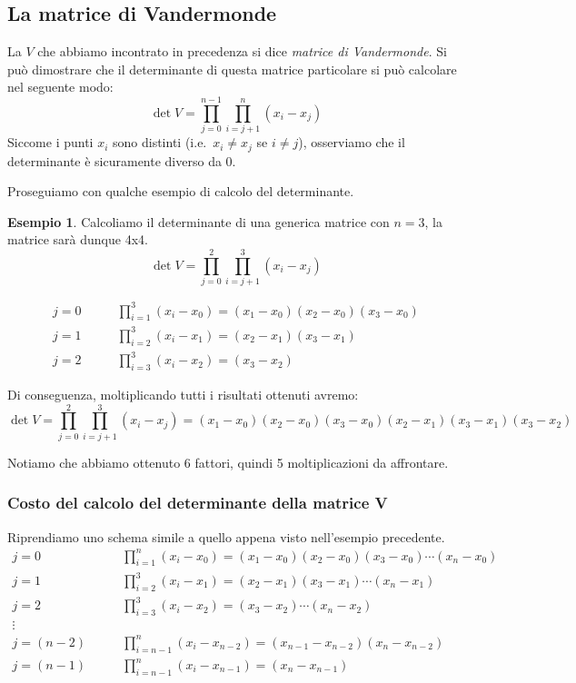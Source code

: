 \documentclass{article}
\theoremstyle{plain}
\theoremstyle{plain}
\theoremstyle{definition}
\theoremstyle{definition}
\newtheorem{esempio}{Esempio}
\begin{document}
\subsection{La matrice di Vandermonde}
La $V$ che abbiamo incontrato in precedenza si dice \emph{matrice di Vandermonde}. Si può dimostrare che il determinante di questa matrice particolare si può calcolare nel seguente modo:
\[
\det V =
\prod_{j=0}^{n-1}
\prod_{i=j+1}^{n}
(x_{i}-x_{j})
\]
Siccome i punti $x_{i}$ sono distinti (i.e.\ $x_{i} \ne x_{j}$ se $i \ne j$), osserviamo che il determinante è sicuramente diverso da $0$.

Proseguiamo con qualche esempio di calcolo del determinante.
\begin{esempio}
	Calcoliamo il determinante di una generica matrice con $n = 3$, la matrice sarà dunque 4x4.
	\[
	\det V =
	\prod_{j=0}^{2}
	\prod_{i=j+1}^{3}
	(x_{i}-x_{j})
	\]

	\begin{align*}
	j = 0 & \qquad \prod_{i=1}^{3} (x_{i}-x_{0})=(x_{1}-x_{0})(x_{2}-x_{0})(x_{3}-x_{0}) \\
	j = 1 & \qquad \prod_{i=2}^{3} (x_{i}-x_{1})=(x_{2}-x_{1})(x_{3}-x_{1}) \\
	j = 2 & \qquad \prod_{i=3}^{3} (x_{i}-x_{2})=(x_{3}-x_{2})
	\end{align*}

	Di conseguenza, moltiplicando tutti i risultati ottenuti avremo:
	\[
	\det V =
	\prod_{j=0}^{2}
	\prod_{i=j+1}^{3}
	(x_{i}-x_{j})
	=
	(x_{1}-x_{0})(x_{2}-x_{0})(x_{3}-x_{0})(x_{2}-x_{1})(x_{3}-x_{1})(x_{3}-x_{2})	
	\]
	
	Notiamo che abbiamo ottenuto 6 fattori, quindi 5 moltiplicazioni da affrontare.
\end{esempio}

\subsubsection{Costo del calcolo del determinante della matrice V}
Riprendiamo uno schema simile a quello appena visto nell'esempio precedente.
\begin{align*}
	j = 0 & \qquad \prod_{i=1}^{n} (x_{i}-x_{0})=(x_{1}-x_{0})(x_{2}-x_{0})(x_{3}-x_{0}) \cdots (x_{n}-x_{0}) \\
	j = 1 & \qquad \prod_{i=2}^{3} (x_{i}-x_{1})=(x_{2}-x_{1})(x_{3}-x_{1}) \cdots (x_{n}-x_{1}) \\
	j = 2 & \qquad \prod_{i=3}^{3} (x_{i}-x_{2})=(x_{3}-x_{2}) \cdots (x_{n}-x_{2}) \\
	\vdots & \\
	j = (n-2) & \qquad \prod_{i=n-1}^{n} (x_{i}-x_{n-2})=(x_{n-1}-x_{n-2})(x_{n}-x_{n-2}) \\
	j = (n-1) & \qquad \prod_{i=n-1}^{n} (x_{i}-x_{n-1})=(x_{n}-x_{n-1}) \\
\end{align*}
\end{document}

